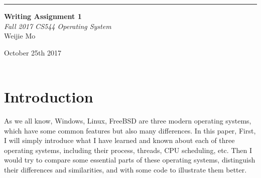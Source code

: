 \documentclass[10pt,draftclsnofoot,peerreview,letterpaper,onecolumn,]{IEEEtran}
\begin{document}
\begin{titlepage} %
	
	\raggedleft %
	
	\rule{1pt}{\textheight} %
	\hspace{0.05\textwidth} %
	\parbox[b]{0.75\textwidth}{ %
		
		{\Huge\bfseries Writing Assignment 1 }\\[2\baselineskip] %
		{\large\textit{Fall 2017 CS544 Operating System}}\\[4\baselineskip] %
		{\Large Weijie Mo} %
		
		\vspace{0.5\textheight} %
		
		{\noindent October 25th 2017}\\[\baselineskip] %
        {\noindent }\\[\baselineskip] %
	}

\end{titlepage}

\section{Introduction}

As we all know, Windows, Linux, FreeBSD are three modern operating systems, which have some common features but also many differences. In this paper, First, I will simply introduce what I have learned and known about each of three operating systems, including their process, threads, CPU scheduling, etc. Then I would try to compare some essential parts of these operating systems, distinguish their differences and similarities, and with some code to illustrate them better.
\end{document}
